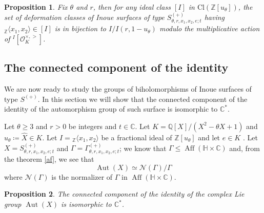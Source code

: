 \documentclass[12pt]{amsart}
\newtheorem{proposition}{Proposition}[section]
\newcommand{\Z}{\mathbb{Z}}
\newcommand{\C}{\mathbb{C}}
\newcommand{\Q}{\mathbb{Q}}
\newcommand{\HH}{\mathbb{H}}
\newcommand{\OO}{\mathcal{O}}
\newcommand{\Nc}{\mathcal{N}}
\DeclareMathOperator{\Aut}{Aut}
\DeclareMathOperator{\Aff}{Aff}
\begin{document}
\begin{proposition}
Fix $\theta$ and $r$, then for any ideal class $[I]$ in $\text{Cl}(\Z[u_\theta])$, the set of deformation classes of Inoue surfaces of type $S^{(+)}_{\theta,r,x_1,x_2,e;t}$ having $_\Z\langle x_1,x_2\rangle \in [I]$ is in bijection to $I/I(r, 1-u_\theta)$ modulo the multiplicative action of ${}^I[\OO_K^{\times,>}]$.
\end{proposition}




\subsection{The connected component of the identity}\label{concom} We are now ready to study the groups of biholomorphisms of Inoue surfaces of type $S^{(+)}$. In this section we will show that the connected component of the identity of the automorphism group of such surface is isomorphic to $\C^*$.\par

\noindent
Let $\theta \geq 3$ and $r > 0$ be integers and $t \in \C$. Let $K=\Q[X]/(X^2 - \theta X + 1)$ and $u_\theta \coloneq \hat{X} \in K$. Let $I = {}_\Z\langle x_1,x_2\rangle$ be a fractional ideal of $\Z[u_\theta]$ and let $e \in K$ . 
Let $X = S^{(+)}_{\theta, r, x_1, x_2, e ; t}$ and $\Gamma = \Gamma^{(+)}_{\theta,r,x_1,x_2,e;t}$; we know that $\Gamma \leq \Aff(\HH \times \C)$ and, from the theorem \ref{af}, we see that 
$$\Aut(X) \simeq \Nc(\Gamma)/ \Gamma$$
where $\Nc(\Gamma)$ is the normalizer of $\Gamma$ in $\Aff(\HH \times \C)$.

\begin{proposition}
The connected component of the identity of the complex Lie group $\Aut(X)$ is isomorphic to $\C^*$.
\end{proposition}
\end{document}
